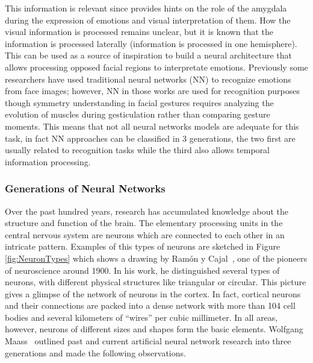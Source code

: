 This information is relevant since provides hints on the role of the amygdala during the expression of emotions and visual interpretation of them. How the visual information is processed remains unclear, but it is known that the information is processed laterally (information is processed in one hemisphere). This can be used as a source of inspiration to build a neural architecture that allows processing opposed facial regions to interpretate emotions. Previously some researchers have used traditional neural networks (NN) to recognize emotions from face images\cite{Spiros2005}; however, NN in those works are used for recognition purposes though symmetry understanding in facial gestures requires analyzing the evolution of muscles during gesticulation rather than comparing gesture moments. This means that not all neural networks models are adequate for this task, in fact NN approaches can be classified in 3 generations, the two first are usually related to recognition tasks while the third also allows temporal information processing.

\subsubsection{Generations of Neural Networks}
Over the past hundred years, research has accumulated knowledge about the structure and function of the brain. The elementary processing units in the central nervous system are neurons which are connected to each other in an intricate pattern. Examples of this types of neurons are sketched in Figure \ref{fig:NeuronTypes} which shows a drawing by Ram\'on y Cajal~\cite{Cajal1995}, one of the pioneers of neuroscience around 1900. In his work, he distinguished several types of neurons, with different physical structures like triangular or circular. This picture gives a glimpse of the network of neurons in the cortex. In fact, cortical neurons and their connections are packed into a dense network with more than 104 cell bodies and several kilometers of ``wires'' per cubic millimeter. In all areas, however, neurons of different sizes and shapes form the basic elements. Wolfgang Maass~\cite{Maass1996} outlined past and current artificial neural network research into three generations and made the following observations.

